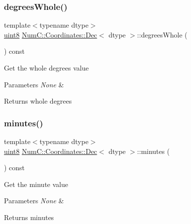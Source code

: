 \subsubsection{\texorpdfstring{degrees\+Whole()}{degreesWhole()}}
{\footnotesize\ttfamily template$<$typename dtype$>$ \\
\mbox{\hyperlink{namespace_num_c_a60b2e2f49e1ff61059731c154e560869}{uint8}} \mbox{\hyperlink{class_num_c_1_1_coordinates_1_1_dec}{Num\+C\+::\+Coordinates\+::\+Dec}}$<$ dtype $>$\+::degrees\+Whole (\begin{DoxyParamCaption}{ }\end{DoxyParamCaption}) const\hspace{0.3cm}{\ttfamily [inline]}}

Get the whole degrees value


\begin{DoxyParams}{Parameters}
{\em None} & \\
\hline
\end{DoxyParams}
\begin{DoxyReturn}{Returns}
whole degrees 
\end{DoxyReturn}
\mbox{\label{class_num_c_1_1_coordinates_1_1_dec_af4f3861e5dfb0f7ea3d8df79ecdad327}} 
\subsubsection{\texorpdfstring{minutes()}{minutes()}}
{\footnotesize\ttfamily template$<$typename dtype$>$ \\
\mbox{\hyperlink{namespace_num_c_a60b2e2f49e1ff61059731c154e560869}{uint8}} \mbox{\hyperlink{class_num_c_1_1_coordinates_1_1_dec}{Num\+C\+::\+Coordinates\+::\+Dec}}$<$ dtype $>$\+::minutes (\begin{DoxyParamCaption}{ }\end{DoxyParamCaption}) const\hspace{0.3cm}{\ttfamily [inline]}}

Get the minute value


\begin{DoxyParams}{Parameters}
{\em None} & \\
\hline
\end{DoxyParams}
\begin{DoxyReturn}{Returns}
minutes 
\end{DoxyReturn}
\mbox{\label{class_num_c_1_1_coordinates_1_1_dec_afa8fe40598ecc6c8258bc2d69c7382e9}} 
